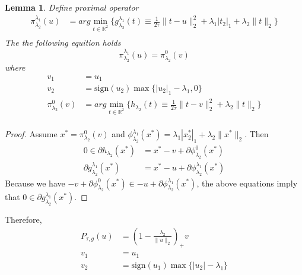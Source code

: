 \documentclass[12pt]{article}
\newtheorem{lemma}[theorem]{Lemma}
\begin{document}
\begin{lemma}
  Define proximal operator
  \begin{equation}
    \begin{split}
    \pi_{\lambda_2}^{\lambda_1}(u) &  = arg\min_{t\in \mathbb{R}^2} \{g_{\lambda_2}^{\lambda_1 }(t) \equiv 
    \frac{1}{2\tau} \parallel t-u \parallel_2^2 + \lambda_1|t_2|_1 + \lambda_2 \parallel t \parallel_2 \} \\
    \end{split}
  \end{equation}
  The the following equition holds
  \begin{equation}
    \pi_{\lambda_2}^{\lambda_1}(u) = \pi_{\lambda_2}^{0}(v)
  \end{equation}
  where
  \begin{equation}
    \begin{split}
      v_1 & = u_1 \\
      v_2 & = \text{sign}(u_2)\max\{ |u_2|_1-\lambda_1, 0 \} \\
      \pi_{\lambda_2}^{0}(v) & = arg\min_{t\in \mathbb{R}^2} \{h_{\lambda_2}(t) \equiv 
      \frac{1}{2\tau} \parallel t-v \parallel_2^2 + \lambda_2 \parallel t \parallel_2 \} \\
    \end{split}
  \end{equation}
  \end{lemma}

  \begin{proof}
    Assume $x^* = \pi_{\lambda_2}^0(v)$ and $\phi_{\lambda_2}^{\lambda_1} (x^*) = \lambda_1|x^*_2|_1 + \lambda_2 \parallel x^* \parallel_2$. Then
    \begin{align}
      0 \in \partial h_{\lambda_2}(x^*) & = x^* -v + \partial \phi_{\lambda_2}^{0} (x^*) \\
      \partial g_{\lambda_2}^{\lambda_1}(x^*) & = x^* - u + \partial \phi_{\lambda_2}^{\lambda_1} (x^*)
    \end{align} 
    Because we have $-v+\partial \phi_{\lambda_2}^{0} (x^*) \in - u + \partial \phi_{\lambda_2}^{\lambda_1} (x^*)$, the above equations imply that $0 \in \partial g_{\lambda_2}^{\lambda_1}(x^*)$.
  \end{proof}

  Therefore, 
  \begin{equation} \label{proximal}
    \begin{split}
   P_{\tau,g}(u) &  = (1-\frac{\lambda_2}{ \parallel u \parallel_2  })_+ v  \\
   v_1 & = u_1 \\
   v_2 & = \text{sign}(u_1)\max\{|u_2|-\lambda_1\}
    \end{split}
  \end{equation}
\end{document}
